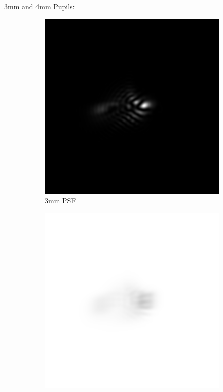 \documentclass{article}
\begin{document}
3mm and 4mm Pupils:
\begin{figure}[H]
\begin{subfigure}{.25\textwidth}
  \centering
  \includegraphics[width=1\linewidth]{Vasha_R_G_0530_2_300_zer_-07_3_PSF.png}
  \caption{3mm PSF}
  \label{fig:3mmStrehlpsf}
\end{subfigure}%
\begin{subfigure}{.25\textwidth}
  \centering
  \includegraphics[width=1\linewidth]{Vasha_R_G_0530_2_300_zer_-07_3_PSF_convE.png}

\end{subfigure}
\end{figure}
\end{document}
